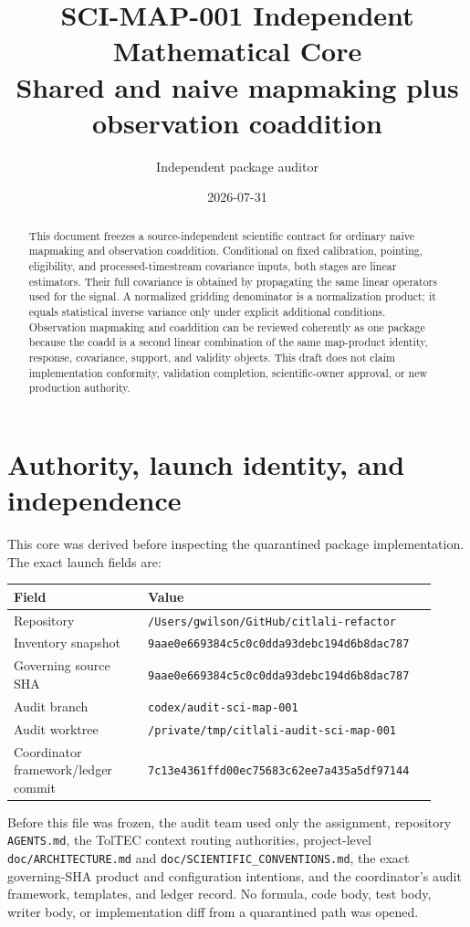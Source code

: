 \documentclass[11pt]{article}
\title{SCI-MAP-001 Independent Mathematical Core\\
\large Shared and naive mapmaking plus observation coaddition}
\author{Independent package auditor}
\date{2026-07-31}
\newcommand{\code}[1]{\nolinkurl{#1}}
\begin{document}
\maketitle

\begin{abstract}
This document freezes a source-independent scientific contract for ordinary
naive mapmaking and observation coaddition. Conditional on fixed calibration,
pointing, eligibility, and processed-timestream covariance inputs, both stages
are linear estimators. Their full covariance is obtained by propagating the
same linear operators used for the signal. A normalized gridding denominator
is a normalization product; it equals statistical inverse variance only under
explicit additional conditions. Observation mapmaking and coaddition can be
reviewed coherently as one package because the coadd is a second linear
combination of the same map-product identity, response, covariance, support,
and validity objects. This draft does not claim implementation conformity,
validation completion, scientific-owner approval, or new production authority.
\end{abstract}
\tableofcontents

\section{Authority, launch identity, and independence}

This core was derived before inspecting the quarantined package implementation.
The exact launch fields are:

\begin{longtable}{L{0.30\linewidth}L{0.62\linewidth}}
\toprule
Field & Value\\
\midrule
Repository & \code{/Users/gwilson/GitHub/citlali-refactor}\\
Inventory snapshot &
\code{9aae0e669384c5c0c0dda93debc194d6b8dac787}\\
Governing source SHA &
\code{9aae0e669384c5c0c0dda93debc194d6b8dac787}\\
Audit branch & \code{codex/audit-sci-map-001}\\
Audit worktree & \code{/private/tmp/citlali-audit-sci-map-001}\\
Coordinator framework/ledger commit &
\code{7c13e4361ffd00ec75683c62ee7a435a5df97144}\\
\bottomrule
\end{longtable}

Before this file was frozen, the audit team used only the assignment,
repository \code{AGENTS.md}, the TolTEC context routing authorities,
project-level \code{doc/ARCHITECTURE.md} and
\code{doc/SCIENTIFIC_CONVENTIONS.md}, the exact governing-SHA product and
configuration intentions, and the coordinator's audit framework, templates,
and ledger record. No formula, code body, test body, writer body, or
implementation diff from a quarantined path was opened.
\end{document}
